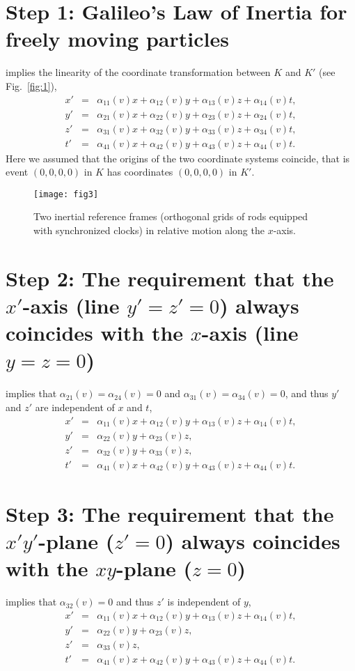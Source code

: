 \documentclass[twocolumn,preprintnumbers,amsmath,amssymb,final]{revtex4}
\def\BEqA{\begin{eqnarray}}
\def\EEqA{\end{eqnarray}}
\def\a{\alpha}
\begin{document}
\newpage

\section*{Step 1: Galileo's Law of Inertia for freely moving particles}


\noindent implies the linearity of the coordinate transformation between $K$ and $K'$
(see Fig.\ \ref{fig:1}),
\BEqA
x'&=&\a_{11}(v)x+\a_{12}(v)y+\a_{13}(v)z+\a_{14}(v)t,
\\
y'&=&\a_{21}(v)x+\a_{22}(v)y+\a_{23}(v)z+\a_{24}(v)t,
\\
z'&=&\a_{31}(v)x+\a_{32}(v)y+\a_{33}(v)z+\a_{34}(v)t,
\\
t'&=&\a_{41}(v)x+\a_{42}(v)y+\a_{43}(v)z+\a_{44}(v)t.
\EEqA
Here we assumed that the origins of the two coordinate systems coincide, that is
event $(0,0,0,0)$ in $K$ has coordinates $(0,0,0,0)$ in $K'$. 
\begin{figure}[!ht]
\texttt{[image: fig3]}
\caption{ \label{fig:3} 
Two inertial reference frames (orthogonal grids of rods equipped 
with synchronized clocks) in relative motion along the $x$-axis.
}
\end{figure}

\section*{Step 2: The requirement that the 
$x'$-axis (line $y'=z'=0$) always coincides with the $x$-axis (line $y=z=0$) 
}

\noindent implies that $\a_{21}(v)=\a_{24}(v)=0$ and $\a_{31}(v)=\a_{34}(v)=0$, 
and thus $y'$ and $z'$ are independent of $x$ and $t$,
\BEqA
x'&=&\a_{11}(v)x+\a_{12}(v)y+\a_{13}(v)z+\a_{14}(v)t,
\\
y'&=&\a_{22}(v)y+\a_{23}(v)z,
\\
z'&=&\a_{32}(v)y+\a_{33}(v)z,
\\
t'&=&\a_{41}(v)x+\a_{42}(v)y+\a_{43}(v)z+\a_{44}(v)t.
\EEqA


\section*{Step 3: The requirement that the 
$x'y'$-plane ($z'=0$) always coincides with the $xy$-plane 
($z=0$) }

\noindent implies that $\a_{32}(v)=0$ and thus $z'$ is independent of $y$,
\BEqA
x'&=&\a_{11}(v)x+\a_{12}(v)y+\a_{13}(v)z+\a_{14}(v)t,
\\
y'&=&\a_{22}(v)y+\a_{23}(v)z,
\\
z'&=&\a_{33}(v)z,
\\
t'&=&\a_{41}(v)x+\a_{42}(v)y+\a_{43}(v)z+\a_{44}(v)t.
\EEqA
\end{document}
